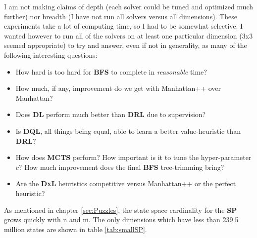 \noindent I am not making claims of depth (each solver could be tuned and optimized much further) nor breadth (I have not run all solvers versus all dimensions). These experiments take a lot of computing time, so I had to be somewhat selective. I wanted however to run all of the solvers on at least one particular dimension (3x3 seemed appropriate) to try and answer, even if not in generality, as many of the following interesting questions:
\begin{itemize}
\item How hard is too hard for \textbf{BFS} to complete in \textit{reasonable} time?
\item How much, if any, improvement do we get with Manhattan++ over Manhattan?
\item Does \textbf{DL} perform much better than \textbf{DRL} due to supervision?
\item Is \textbf{DQL}, all things being equal, able to learn a better value-heuristic than \textbf{DRL}?
\item How does \textbf{MCTS} perform? How important is it to tune the hyper-parameter $c$? How much improvement does the final \textbf{BFS} tree-trimming bring?
\item Are the \textbf{DxL} heuristics competitive versus Manhattan++ or the perfect heuristic?
\end{itemize}












\label{sec:SPLowDimension}


As mentioned in chapter \ref{sec:Puzzles}, the state space cardinality for the \textbf{SP} grows quickly with n and m. The only dimensions which have less than 239.5 million states are shown in table \ref{tab:smallSP}.

